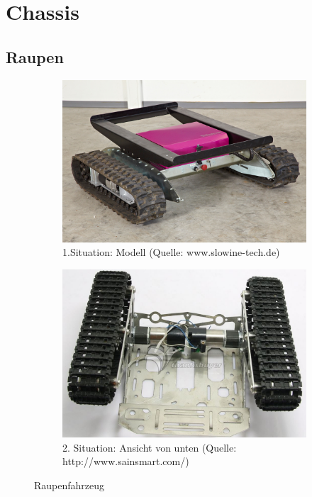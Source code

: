 
\section{Chassis}


\subsection{Raupen}

\begin{figure} [hbp]
	\centering
	\begin{subfigure}[b]{0.4\textwidth}
		\includegraphics[width=\textwidth]{fig/Raupenfahrzeug.jpg}
		\caption{1.Situation: Modell 
		(Quelle: www.slowine-tech.de)}
	\end{subfigure}
	\hfill
	\begin{subfigure}[b]{0.36\textwidth}
		\includegraphics[width=\textwidth]{fig/Raupenfahrzeug-2.JPG}
		\caption{2. Situation: Ansicht von unten
		(Quelle: http://www.sainsmart.com/)}
\end{subfigure}
	\caption{Raupenfahrzeug}\label{fig:animals}
\end{figure}


